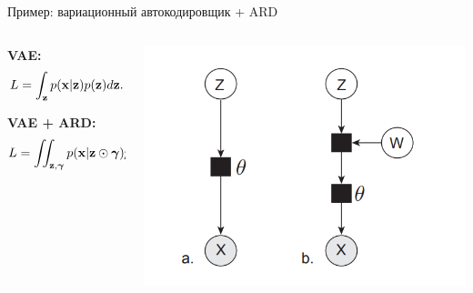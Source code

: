 \documentclass[10pt,pdf,utf8,russian,aspectratio=169]{beamer}
\begin{document}
\begin{frame}{Пример: вариационный автокодировщик + ARD}
\begin{columns}[T] 
\begin{column}{.48\textwidth}
\textbf{VAE:}
\[
    L = \int_{\mathbf{z}} p(\mathbf{x}|\mathbf{z})p(\mathbf{z})d\mathbf{z}.
\]

\textbf{VAE + ARD:}
\[
    L = \iint_{\mathbf{z}, \boldsymbol{\gamma}} p(\mathbf{x}|\mathbf{z} \odot \boldsymbol{\gamma})p(\mathbf{z})p(\boldsymbol{\gamma})d\mathbf{z}d\boldsymbol{\gamma}.
\]
\end{column}
\begin{column}{.48\textwidth}

\includegraphics[width=\textwidth]{ard_vae.png}
\end{column}
\end{columns}

\end{frame}
\end{document}
